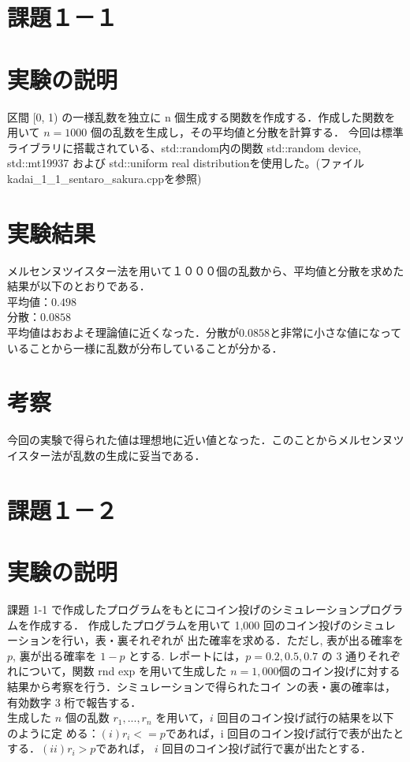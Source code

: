 \documentclass[fleqn, a4paper. 12pt]{ltjsarticle} %
\begin{document}
\section*{課題１－１}
\section*{実験の説明}
区間 [0, 1) の一様乱数を独立に n 個生成する関数を作成する．作成した関数を用いて $n = 1000$ 個の乱数を生成し，その平均値と分散を計算する．
今回は標準ライブラリに搭載されている、std::random内の関数 std::random device, std::mt19937 および std::uniform real distributionを使用した。(ファイルkadai\_1\_1\_sentaro\_sakura.cppを参照)
\section*{実験結果}

メルセンヌツイスター法を用いて１０００個の乱数から、平均値と分散を求めた結果が以下のとおりである．\\
$平均値： 0.498$\\
$分散： 0.0858$\\
平均値はおおよそ理論値に近くなった．分散が$0.0858$と非常に小さな値になっていることから一様に乱数が分布していることが分かる．
\section*{考察}
今回の実験で得られた値は理想地に近い値となった．このことからメルセンヌツイスター法が乱数の生成に妥当である．
\newpage
\section*{課題１－２}
\section*{実験の説明}
課題 1-1 で作成したプログラムをもとにコイン投げのシミュレーションプログラムを作成する．
作成したプログラムを用いて 1,000 回のコイン投げのシミュレーションを行い，表・裏それぞれが
出た確率を求める．ただし, 表が出る確率を $p$, 裏が出る確率を $1 − p$ とする.
レポートには，$p = 0.2, 0.5, 0.7$ の 3 通りそれぞれについて，関数 rnd exp を用いて生成した
$n =1,000$個のコイン投げに対する結果から考察を行う．シミュレーションで得られたコイ
ンの表・裏の確率は，有効数字 3 桁で報告する．\\
生成した $n$ 個の乱数 $r_1, . . . , r_n$ を用いて，$i$ 回目のコイン投げ試行の結果を以下のように定
める：$(i) r_i <= p $であれば，i 回目のコイン投げ試行で表が出たとする．$(ii) r_i > p $であれば，
$i$ 回目のコイン投げ試行で裏が出たとする．
\end{document}

